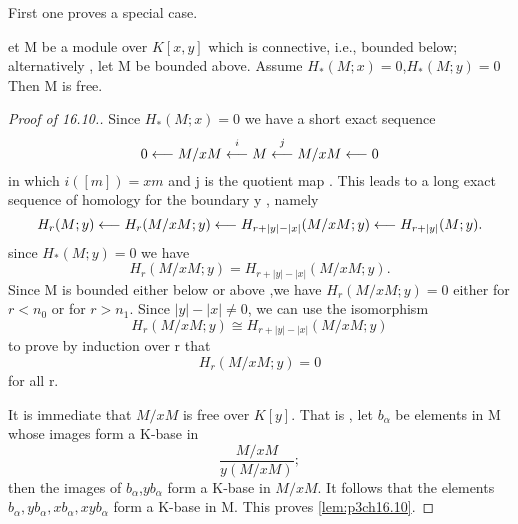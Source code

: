\documentclass[../main]{subfiles}
\begin{document}
First one proves a special case.
\begin{customlemma}{16.10}\label{lem:p3ch16.10} 
et M be a module over $K[x,y]$ which is connective, i.e., bounded below; alternatively , let M be bounded above. Assume $H_{\ast}(M;x)=0$,$ H_{\ast}(M;y)=0$ Then M is free.
    
\end{customlemma}
\begin{proof}[Proof of 16.10.] Since $H_{\ast}(M;x)=0$ we have a short exact sequence \begin{equation*}
    0 \overset{}{\longleftarrow} M/xM \overset{i}{\overset{}{\longleftarrow}} M \overset{j}{\overset{}{\longleftarrow}} M/xM \overset{}{\longleftarrow} 0 
\end{equation*}
in which $i([m])=xm$ and j is the quotient map . This leads to a long exact sequence of homology for the boundary y , namely \begin{equation*}
    H_{r}(M;y) \overset{}{\longleftarrow} H_{r}(M/xM;y) \overset{}{\longleftarrow} H_{r+|y|-|x|}(M/xM;y)\overset{}{\longleftarrow} H_{r+|y|}(M;y).
\end{equation*}
since $H_{\ast}(M;y)=0$ we have \begin{equation*}
    H_{r}(M/xM;y)=H_{r+|y|-|x|}(M/xM;y).
\end{equation*}
Since M is bounded either below or above ,we have $H_{r}(M/xM;y)=0$ either for $r<n_{0}$ or for $r>n_{1}$. Since $|y|-|x| \neq 0$, we can use the isomorphism \begin{equation*}
    H_{r}(M/xM;y) \cong H_{r+|y|-|x|}(M/xM;y)
\end{equation*} 
to prove by induction over r that \begin{equation*}
     H_{r}(M/xM;y)=0
\end{equation*}
for all r. 

It is immediate that $M/xM$ is free over $K[y]$. That is , let $b_{\alpha}$ be elements in M whose images form a K-base in \begin{equation*}
    \frac{M/xM}{y(M/xM)};
\end{equation*}
then the images of $b_{\alpha}$,$yb_{\alpha}$ form a K-base in $M/xM$. It follows that the elements $b_{\alpha},yb_{\alpha},xb_{\alpha},xyb_{\alpha}$ form a K-base in M. This proves \ref{lem:p3ch16.10}.
\end{proof}
\end{document}
